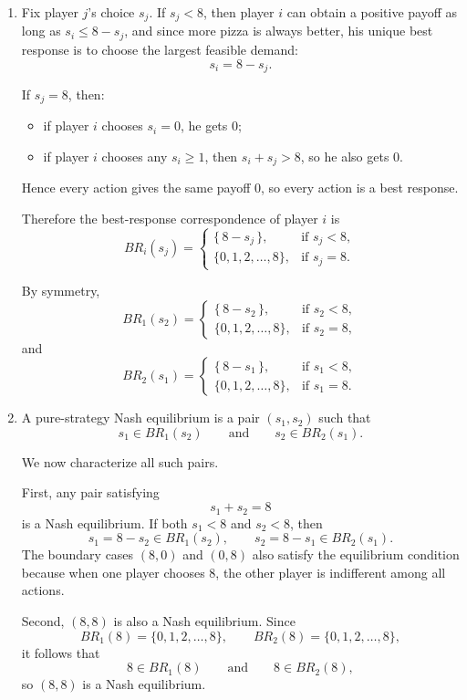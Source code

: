 \documentclass[12pt,a4paper]{article}
\begin{document}
\begin{enumerate}[label=(\alph*)]
  \item Fix player \(j\)'s choice \(s_j\). If \(s_j<8\), then player \(i\) can obtain a positive payoff as long as \(s_i\le 8-s_j\), and since more pizza is always better, his unique best response is to choose the largest feasible demand:
  \[
  s_i=8-s_j.
  \]

  If \(s_j=8\), then:
  \begin{itemize}
      \item if player \(i\) chooses \(s_i=0\), he gets \(0\);
      \item if player \(i\) chooses any \(s_i\ge 1\), then \(s_i+s_j>8\), so he also gets \(0\).
  \end{itemize}
  Hence every action gives the same payoff \(0\), so every action is a best response.

  Therefore the best-response correspondence of player \(i\) is
  \[
  BR_i(s_j)=
  \begin{cases}
  \{\,8-s_j\,\}, & \text{if } s_j<8,\\[4pt]
  \{0,1,2,\dots,8\}, & \text{if } s_j=8.
  \end{cases}
  \]

  By symmetry,
  \[
  BR_1(s_2)=
  \begin{cases}
  \{\,8-s_2\,\}, & \text{if } s_2<8,\\[4pt]
  \{0,1,2,\dots,8\}, & \text{if } s_2=8,
  \end{cases}
  \]
  and
  \[
  BR_2(s_1)=
  \begin{cases}
  \{\,8-s_1\,\}, & \text{if } s_1<8,\\[4pt]
  \{0,1,2,\dots,8\}, & \text{if } s_1=8.
  \end{cases}
  \]

  \item A pure-strategy Nash equilibrium is a pair \((s_1,s_2)\) such that
  \[
  s_1\in BR_1(s_2)
  \qquad\text{and}\qquad
  s_2\in BR_2(s_1).
  \]

  We now characterize all such pairs.

  First, any pair satisfying
  \[
  s_1+s_2=8
  \]
  is a Nash equilibrium. If both \(s_1<8\) and \(s_2<8\), then
  \[
  s_1=8-s_2\in BR_1(s_2),\qquad s_2=8-s_1\in BR_2(s_1).
  \]
  The boundary cases \((8,0)\) and \((0,8)\) also satisfy the equilibrium condition because when one player chooses \(8\), the other player is indifferent among all actions.

  Second, \((8,8)\) is also a Nash equilibrium. Since
  \[
  BR_1(8)=\{0,1,2,\dots,8\},\qquad BR_2(8)=\{0,1,2,\dots,8\},
  \]
  it follows that
  \[
  8\in BR_1(8)\qquad\text{and}\qquad 8\in BR_2(8),
  \]
  so \((8,8)\) is a Nash equilibrium.


\end{enumerate}
\end{document}
